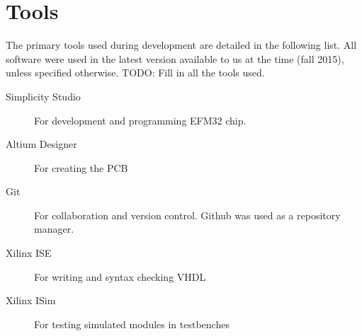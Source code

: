 \section{Tools}
The primary tools used during development are detailed in the following list. All software were used in the latest version available to us at the time (fall 2015), unless specified otherwise.
TODO: Fill in all the tools used.

\begin{description}
    \item[Simplicity Studio] For development and programming EFM32 chip.
    \item[Altium Designer] For creating the PCB
    \item[Git] For collaboration and version control. Github was used as a repository manager.
    \item[Xilinx ISE] For writing and syntax checking VHDL
    \item[Xilinx ISim] For testing simulated modules in testbenches
\end{description}